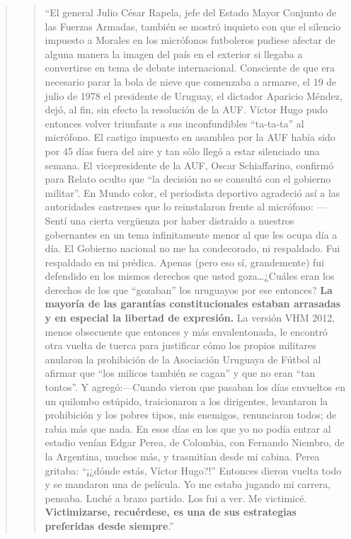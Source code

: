 \begin{quote}
\begin{quote}
	\enquote{El general Julio César Rapela, jefe del Estado Mayor Conjunto de las Fuerzas Armadas, también se mostró inquieto con que el silencio impuesto a Morales en los micrófonos futboleros pudiese afectar de alguna manera la imagen del país en el exterior si llegaba a convertirse en tema de debate internacional. Consciente de que era necesario parar la bola de nieve que comenzaba a armarse, el 19 de julio de 1978 el presidente de Uruguay, el dictador Aparicio Méndez, dejó, al fin, sin efecto la resolución de la AUF. Víctor Hugo pudo entonces volver triunfante a sus inconfundibles ``ta-ta-ta'' al micrófono. El castigo impuesto en asamblea por la AUF había sido por 45 días fuera del aire y tan sólo llegó a estar silenciado una semana. El vicepresidente de la AUF, Oscar Schiaffarino, confirmó para Relato oculto que ``la decisión no se consultó con el gobierno militar''. En Mundo color, el periodista deportivo agradeció así a las autoridades castrenses que lo reinstalaron frente al micrófono: ---Sentí una cierta vergüenza por haber distraído a nuestros gobernantes en un tema infinitamente menor al que les ocupa día a día. El Gobierno nacional no me ha condecorado, ni respaldado. Fui respaldado en mi prédica. Apenas (pero eso sí, grandemente) fui defendido en los mismos derechos que usted goza\dots ¿Cuáles eran los derechos de los que ``gozaban'' los uruguayos por ese entonces? \textbf{La mayoría de las garantías constitucionales estaban arrasadas y en especial la libertad de expresión.} La versión VHM 2012, menos obsecuente que entonces y más envalentonada, le encontró otra vuelta de tuerca para justificar cómo los propios militares anularon la prohibición de la Asociación Uruguaya de Fútbol al afirmar que ``los milicos también se cagan'' y que no eran ``tan tontos''. Y agregó:---Cuando vieron que pasaban los días envueltos en un quilombo estúpido, traicionaron a los dirigentes, levantaron la prohibición y los pobres tipos, mis enemigos, renunciaron todos; de rabia más que nada. En esos días en los que yo no podía entrar al estadio venían Edgar Perea, de Colombia, con Fernando Niembro, de la Argentina, muchos más, y trasmitían desde mi cabina. Perea gritaba: ``¡¿dónde estás, Víctor Hugo?!'' Entonces dieron vuelta todo y se mandaron una de película. Yo me estaba jugando mi carrera, pensaba. Luché a brazo partido. Los fui a ver. Me victimicé. \textbf{Victimizarse, recuérdese, es una de sus estrategias preferidas desde siempre}.}
\end{quote}



\end{quote}
